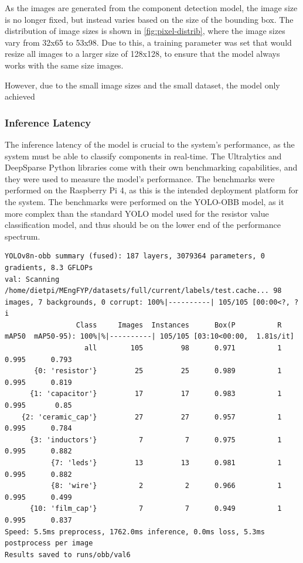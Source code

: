 As the images are generated from the component detection model, the image size is no longer fixed, but instead varies based on the size of the bounding box. The distribution of image sizes is shown in \autoref{fig:pixel-distrib}, where the image sizes vary from 32x65 to 53x98. Due to this, a training parameter was set that would resize all images to a larger size of 128x128, to ensure that the model always works with the same size images.

However, due to the small image sizes and the small dataset, the model only achieved

\subsubsection{Inference Latency}
The inference latency of the model is crucial to the system's performance, as the system must be able to classify components in real-time. The Ultralytics and DeepSparse Python libraries come with their own benchmarking capabilities, and they were used to measure the model's performance. The benchmarks were performed on the Raspberry Pi 4, as this is the intended deployment platform for the system. The benchmarks were performed on the YOLO-OBB model, as it more complex than the standard YOLO model used for the resistor value classification model, and thus should be on the lower end of the performance spectrum.

\begin{minipage}[H]{\textwidth}
  \centering
  \begin{verbatim}
YOLOv8n-obb summary (fused): 187 layers, 3079364 parameters, 0 gradients, 8.3 GFLOPs
val: Scanning /home/dietpi/MEngFYP/datasets/full/current/labels/test.cache... 98 images, 7 backgrounds, 0 corrupt: 100%|----------| 105/105 [00:00<?, ?i
                 Class     Images  Instances      Box(P          R      mAP50  mAP50-95): 100%|%|----------| 105/105 [03:10<00:00,  1.81s/it]
                   all        105         98      0.971          1      0.995      0.793
       {0: 'resistor'}         25         25      0.989          1      0.995      0.819
      {1: 'capacitor'}         17         17      0.983          1      0.995       0.85
    {2: 'ceramic_cap'}         27         27      0.957          1      0.995      0.784
      {3: 'inductors'}          7          7      0.975          1      0.995      0.882
           {7: 'leds'}         13         13      0.981          1      0.995      0.882
           {8: 'wire'}          2          2      0.966          1      0.995      0.499
      {10: 'film_cap'}          7          7      0.949          1      0.995      0.837
Speed: 5.5ms preprocess, 1762.0ms inference, 0.0ms loss, 5.3ms postprocess per image
Results saved to runs/obb/val6
  \end{verbatim}
  \label{code:inference-latency}
\end{minipage}

